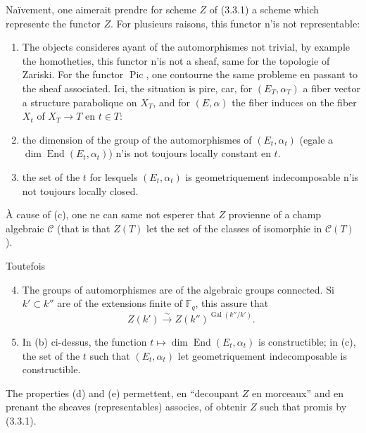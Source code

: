 \documentclass[11pt,a4paper]{article}
\theoremstyle{plain}
\theoremstyle{definition}
\DeclareMathOperator{\Gal}{Gal}
\DeclareMathOperator{\End}{End}
\DeclareMathOperator{\Pic}{Pic}
\newcommand{\F}{\mathbb{F}}
\begin{document}
Na\"ivement, one aimerait prendre for scheme $Z$ of (3.3.1) a scheme which represente the functor $Z$. For plusieurs raisons, this functor n'is not representable:
\begin{enumerate}[label=(\alph*)]
\item The objects consideres ayant of the automorphismes not trivial, by example the homotheties, this functor n'is not a sheaf, same for the topologie of Zariski. For the functor $\Pic$, one contourne the same probleme en passant to the sheaf associated. Ici, the situation is pire, car, for $(E_T, \alpha_T)$ a fiber vector a structure parabolique on $X_T$, and for $(E, \alpha)$ the fiber induces on the fiber $X_t$ of $X_T \to T$ en $t \in T$:
\item the dimension of the group of the automorphismes of $(E_t, \alpha_t)$ (egale a $\dim \End(E_t, \alpha_t)$) n'is not toujours locally constant en $t$.
\item the set of the $t$ for lesquels $(E_t, \alpha_t)$ is geometriquement indecomposable n'is not toujours locally closed.
\end{enumerate}
\`A cause of (c), one ne can same not esperer that $Z$ provienne of a champ algebraic $\mathcal{C}$ (that is that $Z(T)$ let the set of the classes of isomorphie in $\mathcal{C}(T)$).

Toutefois
\begin{enumerate}[label=(\alph*)]
\setcounter{enumi}{3}
\item The groups of automorphismes are of the algebraic groups connected. Si $k' \subset k''$ are of the extensions finite of $\F_q$, this assure that
\[
Z(k') \xrightarrow{\sim} Z(k'')^{\Gal(k''/k')}.
\]
\item In (b) ci-dessus, the function $t \mapsto \dim \End(E_t, \alpha_t)$ is constructible; in (c), the set of the $t$ such that $(E_t, \alpha_t)$ let geometriquement indecomposable is constructible.
\end{enumerate}

The properties (d) and (e) permettent, en ``decoupant $Z$ en morceaux'' and en prenant the sheaves (representables) associes, of obtenir $Z$ such that promis by (3.3.1).
\end{document}
